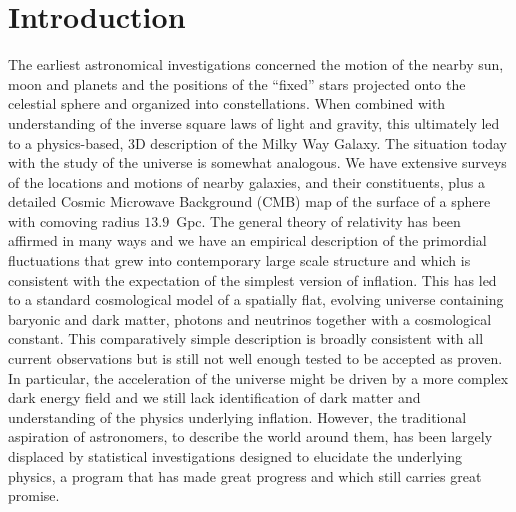 \documentclass[useAMS,usenatbib,a4paper]{mn2e}
\begin{document}
\section{Introduction}
The earliest astronomical investigations concerned the motion of the nearby sun, moon and planets  and the positions of the ``fixed'' stars projected onto the celestial sphere and organized into constellations. When combined with understanding of the inverse square laws of light and gravity, this ultimately led to a physics-based, 3D description of the Milky Way Galaxy. The situation today with the study of the universe is somewhat analogous. We have extensive surveys of the locations and motions of nearby galaxies, and their constituents, plus a detailed Cosmic Microwave Background (CMB) map of the surface of a sphere with comoving radius $13.9$~Gpc. The general theory of relativity has been affirmed in many ways and we have an empirical description of the primordial fluctuations that grew into contemporary large scale structure and which is consistent with the expectation of the simplest version of inflation. This has led to a standard cosmological model of a spatially flat, evolving universe containing baryonic and dark matter, photons and neutrinos together with a cosmological constant. This comparatively simple description is broadly consistent with all current observations but is still not well enough tested to be accepted as proven. In particular, the acceleration of the universe might be driven by a more complex dark energy field and we still lack identification of dark matter and understanding of the physics underlying inflation. However, the traditional aspiration of astronomers, to describe the world around them, has been largely displaced by statistical investigations designed to elucidate the underlying physics, a program that has made great progress and which still carries great promise.
\end{document}
